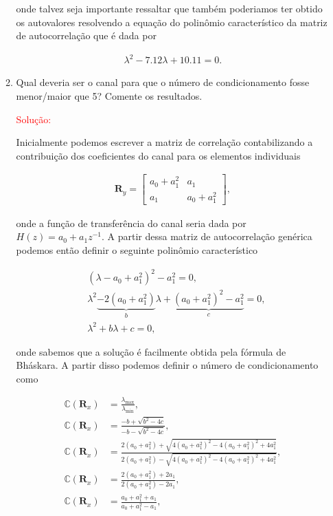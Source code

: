\documentclass[a4paper,10pt]{article}
\begin{document}
\begin{enumerate}
\begin{enumerate}
						onde talvez seja importante ressaltar que também poderiamos ter obtido os autovalores resolvendo a equação do polinômio
						característico da matriz de autocorrelação que é dada por

						\begin{align}
							\lambda^{2} - 7.12 \lambda + 10.11 = 0. 
						\end{align}

					\item Qual deveria ser o canal para que o número de condicionamento fosse menor/maior que 5?
					Comente os resultados.
					
						\textcolor{red}{Solução:}
						
						Inicialmente podemos escrever a matriz de correlação contabilizando a contribuição dos coeficientes do canal para os elementos individuais
						
						\begin{align}
							\mathbf{R}_{y} =
							\begin{bmatrix}
								a_{0} + a^{2}_{1} & a_{1}\\
								a_{1} & a_{0} + a^{2}_{1}
							\end{bmatrix},
						\end{align}

						onde a função de transferência do canal seria dada por $H(z) = a_{0} + a_{1}z^{-1}$. A partir dessa matriz de autocorrelação genérica podemos então 
						definir o seguinte polinômio característico

						\begin{align}
							&(\lambda - a_{0} + a^{2}_{1})^{2} - a^{2}_{1} = 0, \\
							&\lambda^{2} \underbrace{- 2 (a_{0} + a^{2}_{1})}_{b} \lambda + \underbrace{(a_{0} + a^{2}_{1})^{2} - a^{2}_{1}}_{c} = 0, \\
							&\lambda^{2} + b \lambda + c = 0,
						\end{align}

						onde sabemos que a solução é facilmente obtida pela fórmula de Bháskara. A partir disso podemos definir o número de condicionamento como

						\begin{align}
							\mathbb{C} (\mathbf{R}_{x}) &= \frac{\lambda_{\text{max}}}{\lambda_{\text{min}}}, \\
							\mathbb{C} (\mathbf{R}_{x}) &= \frac{- b + \sqrt{b^{2} - 4c}}{- b - \sqrt{b^{2} - 4c}}, \\
							\mathbb{C} (\mathbf{R}_{x}) &= \frac{2 (a_{0} + a^{2}_{1}) + \sqrt{4 (a_{0} + a^{2}_{1})^{2} - 4 (a_{0} + a^{2}_{1})^{2} + 4 a^{2}_{1}}}{2 (a_{0} + a^{2}_{1}) - \sqrt{4 (a_{0} + a^{2}_{1})^{2} - 4 (a_{0} + a^{2}_{1})^{2} + 4 a^{2}_{1}}}, \\
							\mathbb{C} (\mathbf{R}_{x}) &= \frac{2 (a_{0} + a^{2}_{1}) + 2a_{1}}{2 (a_{0} + a^{2}_{1}) - 2a_{1}}, \\
							\mathbb{C} (\mathbf{R}_{x}) &= \frac{a_{0} + a^{2}_{1} + a_{1}}{a_{0} + a^{2}_{1} - a_{1}},
						\end{align}


\end{enumerate}
\end{enumerate}
\end{document}
